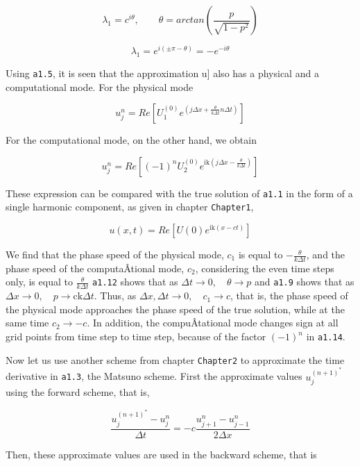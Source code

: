 {\[\lambda_{1} = c^{i\theta}, \qquad \theta = arctan\left( \frac{p}{\sqrt{1 - p^{2}}} \right)\]}

\[\lambda_{1} = e^{i\left( \pm\pi-\theta\right)} = - e^{- i\theta}\]

Using \texttt{a1.5}, it is seen that the approximation u{]} also has a
physical and a computational mode. For the physical mode

{\[u_{j}^{n} = Re\left\lbrack U_{1}^{\left( 0 \right)}e^{\left( j\Delta x 
+ \frac{\theta}{k\Delta t}n\Delta t \right)} \right\rbrack\]}

For the computational mode, on the other hand, we obtain

{\[u_{j}^{n} = Re\left\lbrack \left( - 1 \right)^{n}U_{2}^{\left( 0 \right)}
e^{\text{ik}\left( j\Delta x - \frac{\theta}{k\Delta t} \right)} \right\rbrack\]}

These expression can be compared with the true solution of \texttt{a1.1}
in the form of a single harmonic component, as given in chapter
\texttt{Chapter1},

{\[u\left( x,t \right) = Re\left\lbrack U\left( 0 \right)e^{\text{ik}
\left( x - c t \right)} \right\rbrack\]}

We find that the phase speed of the physical mode, \(c_{1}\) is equal to
\(- \frac{\theta}{k\Delta t}\), and the phase speed of the
computaÂ­tional mode, \(c_{2}\), considering the even time steps only, is
equal to \(\frac{\theta}{k\Delta t}\) \texttt{a1.12} shows that as
\(\Delta t \rightarrow 0, \quad \theta \rightarrow p\) and \texttt{a1.9}
shows that as
\(\Delta x \rightarrow 0, \quad p  \rightarrow \text{ck}\Delta t\).
Thus, as \(\Delta x,\Delta t \rightarrow 0, \quad c_{1} \rightarrow c\),
that is, the phase speed of the physical mode approaches the phase speed
of the true solution, while at the same time \(c_{2} \rightarrow - c\).
In addition, the compuÂ­tational mode changes sign at all grid points
from time step to time step, because of the factor
\(\left( - 1 \right)^{n}\) in \texttt{a1.14}.

Now let us use another scheme from chapter \texttt{Chapter2} to
approximate the time derivative in \texttt{a1.3}, the Matsuno scheme.
First the approximate values \(u_{j}^{\left( n + 1 \right)^{*}}\) using
the forward scheme, that is,

{\[\frac{u_{j}^{\left( n + 1 \right)^{*}} - u_{j}^{n}}{\Delta t} 
= - c\frac{u_{j + 1}^{n} - u_{j - 1}^{n}}{2\Delta x}\]}

Then, these approximate values are used in the backward scheme, that is

